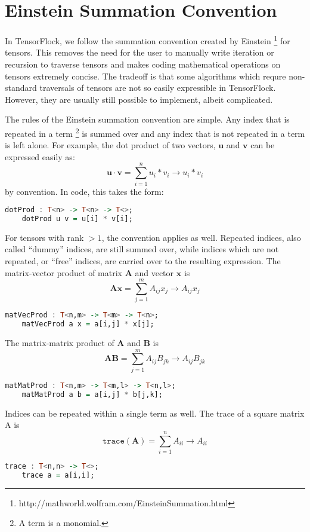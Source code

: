 \pagebreak
\section{Einstein Summation Convention}%
\label{sec:einstein_summation_convention}

In TensorFlock, we follow the summation convention created by Einstein
\footnote{http://mathworld.wolfram.com/EinsteinSummation.html} 
for tensors. This removes the need for the user to manually write iteration or
recursion to traverse tensors and makes coding mathematical operations on
tensors extremely concise. The tradeoff is that some algorithms which requre
non-standard traversals of tensors are not so easily expressible in
TensorFlock. However, they are usually still possible to implement, albeit
complicated. 

The rules of the Einstein summation convention are simple. 
Any index that is repeated in a term \footnote{A term is a monomial.}  
is summed over and any index that is not repeated in a term is left alone.
For example, the dot product of two vectors, $\mathbf{u}$ and $\mathbf{v}$
can be expressed easily as: 
\[\mathbf{u} \cdot \mathbf{v} = \sum^{n}_{i=1} u_i * v_i \rightarrow u_i * v_i\] by
convention. In code, this takes the form:
\begin{lstlisting}[language=haskell]
    dotProd : T<n> -> T<n> -> T<>;
    dotProd u v = u[i] * v[i];
\end{lstlisting}

For tensors with rank $> 1$, the convention applies as well. Repeated indices,
also called ``dummy'' indices, are still summed over, while indices which are
not repeated, or ``free'' indices, are carried over to the resulting
expression. The matrix-vector product of matrix $\mathbf{A}$ and vector
$\mathbf{x}$ is  
\[ \mathbf{A} \mathbf{x} = \sum^{m}_{j=1} A_{ij} x_j \rightarrow A_{ij} x_j \]
\begin{lstlisting}[language=haskell]
    matVecProd : T<n,m> -> T<m> -> T<n>;
    matVecProd a x = a[i,j] * x[j];
\end{lstlisting}

The matrix-matrix product of $ \mathbf{A} $ and $ \mathbf{B} $ is 
\[ \mathbf{A} \mathbf{B} = \sum^{m}_{j=1} A_{ij} B_{jk} 
   \rightarrow A_{ij} B_{jk} \]
\begin{lstlisting}[language=haskell]
    matMatProd : T<n,m> -> T<m,l> -> T<n,l>;
    matMatProd a b = a[i,j] * b[j,k];
\end{lstlisting}

Indices can be repeated within a single term as well. The trace of a square
matrix A is \[ \texttt{trace}( \mathbf{A} ) = \sum^{n}_{i=1} A_{ii} \rightarrow A_{ii}\] 
\begin{lstlisting}[language=haskell]
    trace : T<n,n> -> T<>;
    trace a = a[i,i];
\end{lstlisting}

